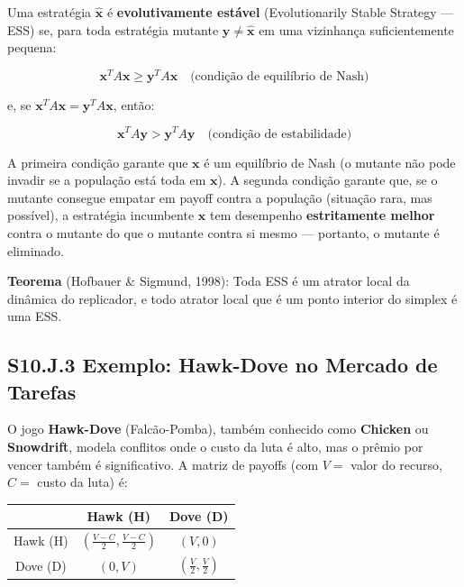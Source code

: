 Uma estratégia $\hat{\mathbf{x}}$ é \textbf{evolutivamente estável} (Evolutionarily Stable Strategy --- ESS) se, para toda estratégia mutante $\mathbf{y} \neq \hat{\mathbf{x}}$ em uma vizinhança suficientemente pequena:

\begin{equation}\label{eq:ess_formal}
\mathbf{x}^T A \mathbf{x} \geq \mathbf{y}^T A \mathbf{x} \quad \text{(condição de equilíbrio de Nash)}
\end{equation}

e, se $\mathbf{x}^T A \mathbf{x} = \mathbf{y}^T A \mathbf{x}$, então:

\begin{equation}\label{eq:ess_stability}
\mathbf{x}^T A \mathbf{y} > \mathbf{y}^T A \mathbf{y} \quad \text{(condição de estabilidade)}
\end{equation}

A primeira condição garante que $\mathbf{x}$ é um equilíbrio de Nash (o mutante não pode invadir se a população está toda em $\mathbf{x}$). A segunda condição garante que, se o mutante consegue empatar em payoff contra a população (situação rara, mas possível), a estratégia incumbente $\mathbf{x}$ tem desempenho \textbf{estritamente melhor} contra o mutante do que o mutante contra si mesmo --- portanto, o mutante é eliminado.

\textbf{Teorema} (Hofbauer \& Sigmund, 1998): Toda ESS é um atrator local da dinâmica do replicador, e todo atrator local que é um ponto interior do simplex é uma ESS.

\subsection*{S10.J.3 Exemplo: Hawk-Dove no Mercado de Tarefas}

O jogo \textbf{Hawk-Dove} (Falcão-Pomba), também conhecido como \textbf{Chicken} ou \textbf{Snowdrift}, modela conflitos onde o custo da luta é alto, mas o prêmio por vencer também é significativo. A matriz de payoffs (com $V =$ valor do recurso, $C =$ custo da luta) é:

\begin{center}
\begin{tabular}{c|c|c|}
& Hawk (H) & Dove (D) \\
\hline
Hawk (H) & $(\frac{V-C}{2}, \frac{V-C}{2})$ & $(V, 0)$ \\
\hline
Dove (D) & $(0, V)$ & $(\frac{V}{2}, \frac{V}{2})$ \\
\hline
\end{tabular}
\end{center}

